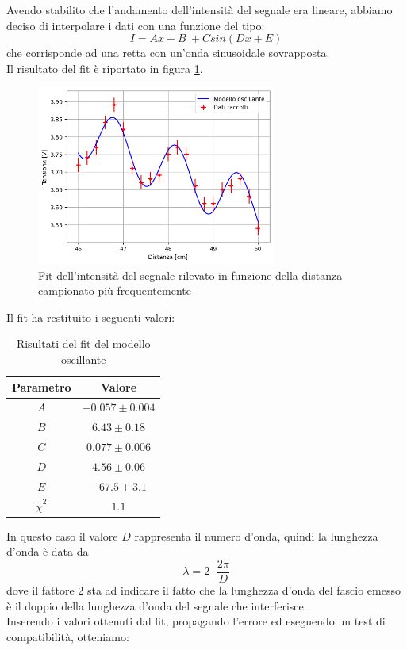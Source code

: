 \documentclass[letterpaper,12pt]{article}
\begin{document}
Avendo stabilito che l'andamento dell'intensità del segnale era lineare, abbiamo deciso di interpolare i dati con una funzione del tipo:
\begin{equation}
	I = Ax + B\ + Csin(Dx + E)
	\label{eq:modello_oscillante}
\end{equation}
che corrisponde ad una retta con un'onda sinusoidale sovrapposta.\\
Il risultato del fit è riportato in figura \ref{fig:fit_distanza_ondulatori}.

\begin{figure}[h!]
	\centering
	\includegraphics[width = 0.7\textwidth]{fit_distanza_ondulatori.png}
	\caption{Fit dell'intensità del segnale rilevato in funzione della distanza campionato più frequentemente}
	\label{fig:fit_distanza_ondulatori}
\end{figure}

Il fit ha restituito i seguenti valori:
\begin{table}[h!]
	\centering
	\begin{tabular}{|c c|}
		\hline
		\textbf{Parametro} & \textbf{Valore} \\
		\hline
		$A$ & $-0.057 \pm 0.004$ \\
		$B$ & $6.43 \pm 0.18$ \\
		$C$ & $0.077 \pm 0.006$ \\
		$D$ & $4.56 \pm 0.06$ \\
		$E$ & $-67.5 \pm 3.1$ \\
		$\tilde\chi^2$ & $1.1$ \\
		\hline
	\end{tabular}
	\caption{Risultati del fit del modello oscillante}
	\label{tab:fit_distanza_ondulatori}
\end{table}

In questo caso il valore $D$ rappresenta il numero d'onda, quindi la lunghezza d'onda è data da
$$\lambda = 2\cdot \frac{2\pi}{D}$$
dove il fattore 2 sta ad indicare il fatto che la lunghezza d'onda del fascio emesso è il doppio della lunghezza d'onda del segnale che interferisce.\\
Inserendo i valori ottenuti dal fit, propagando l'errore ed eseguendo un test di compatibilità, otteniamo:
\end{document}

